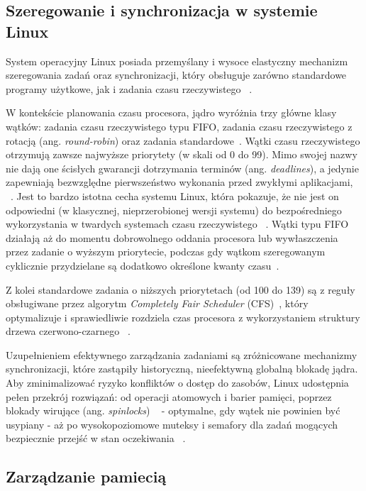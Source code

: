 \subsection{Szeregowanie i synchronizacja w systemie Linux}
System operacyjny Linux posiada przemyślany i wysoce elastyczny mechanizm szeregowania zadań oraz synchronizacji, który obsługuje zarówno standardowe programy użytkowe, jak i zadania czasu rzeczywistego ~\cite{Tanenbaum}. 

W kontekście planowania czasu procesora, jądro wyróżnia trzy główne klasy wątków: zadania czasu rzeczywistego typu FIFO, zadania czasu rzeczywistego z rotacją (ang. \textit{round-robin}) oraz zadania standardowe~\cite{Tanenbaum}. Wątki czasu rzeczywistego otrzymują zawsze najwyższe priorytety (w skali od 0 do 99). Mimo swojej nazwy nie dają one ścisłych gwarancji dotrzymania terminów (ang. \textit{deadlines}), a jedynie zapewniają bezwzględne pierwszeństwo wykonania przed zwykłymi aplikacjami, ~\cite{Tanenbaum}. Jest to bardzo istotna cecha systemu Linux, która pokazuje, że nie jest on odpowiedni (w klasycznej, nieprzerobionej wersji systemu) do bezpośredniego wykorzystania w twardych systemach czasu rzeczywistego ~\cite{LinuxKernelDevelopment}.
Wątki typu FIFO działają aż do momentu dobrowolnego oddania procesora lub wywłaszczenia przez zadanie o wyższym priorytecie, podczas gdy wątkom szeregowanym cyklicznie przydzielane są dodatkowo określone kwanty czasu~\cite{Tanenbaum}.

Z kolei standardowe zadania o niższych priorytetach (od 100 do 139) są z reguły obsługiwane przez algorytm \textit{Completely Fair Scheduler} (CFS)~\cite{Tanenbaum}, który optymalizuje i sprawiedliwie rozdziela czas procesora z wykorzystaniem struktury drzewa czerwono-czarnego ~\cite{Abraham_Silberschatz}.

Uzupełnieniem efektywnego zarządzania zadaniami są zróżnicowane mechanizmy synchronizacji, które zastąpiły historyczną, nieefektywną globalną blokadę jądra. Aby zminimalizować ryzyko konfliktów o dostęp do zasobów, Linux udostępnia pełen przekrój rozwiązań: od operacji atomowych i barier pamięci, poprzez blokady wirujące (ang. \textit{spinlocks}) ~\cite{LinuxKernelDevelopment} - optymalne, gdy wątek nie powinien być usypiany - aż po wysokopoziomowe muteksy i semafory dla zadań mogących bezpiecznie przejść w stan oczekiwania ~\cite{Tanenbaum}.
\subsection{Zarządzanie pamiecią}\label{Linux_wykorzystaniePamieci}

